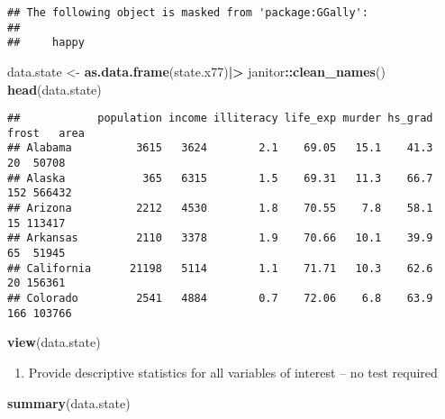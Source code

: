 \documentclass[
]{article}
\newenvironment{Shaded}{\begin{snugshade}}{\end{snugshade}}
\newcommand{\FunctionTok}[1]{\textcolor[rgb]{0.13,0.29,0.53}{\textbf{#1}}}
\newcommand{\NormalTok}[1]{#1}
\newcommand{\OtherTok}[1]{\textcolor[rgb]{0.56,0.35,0.01}{#1}}
\newcommand{\SpecialCharTok}[1]{\textcolor[rgb]{0.81,0.36,0.00}{\textbf{#1}}}
\providecommand{\tightlist}{%
  \setlength{\itemsep}{0pt}\setlength{\parskip}{0pt}}
\begin{document}
\begin{verbatim}
## The following object is masked from 'package:GGally':
## 
##     happy
\end{verbatim}

\begin{Shaded}
\begin{Highlighting}[]
\NormalTok{data.state }\OtherTok{\textless{}{-}} \FunctionTok{as.data.frame}\NormalTok{(state.x77)}\SpecialCharTok{|\textgreater{}} 
\NormalTok{  janitor}\SpecialCharTok{::}\FunctionTok{clean\_names}\NormalTok{() }
\FunctionTok{head}\NormalTok{(data.state)}
\end{Highlighting}
\end{Shaded}

\begin{verbatim}
##            population income illiteracy life_exp murder hs_grad frost   area
## Alabama          3615   3624        2.1    69.05   15.1    41.3    20  50708
## Alaska            365   6315        1.5    69.31   11.3    66.7   152 566432
## Arizona          2212   4530        1.8    70.55    7.8    58.1    15 113417
## Arkansas         2110   3378        1.9    70.66   10.1    39.9    65  51945
## California      21198   5114        1.1    71.71   10.3    62.6    20 156361
## Colorado         2541   4884        0.7    72.06    6.8    63.9   166 103766
\end{verbatim}

\begin{Shaded}
\begin{Highlighting}[]
\FunctionTok{view}\NormalTok{(data.state)}
\end{Highlighting}
\end{Shaded}

\begin{enumerate}
\def\labelenumi{\alph{enumi})}
\tightlist
\item
  Provide descriptive statistics for all variables of interest -- no
  test required
\end{enumerate}

\begin{Shaded}
\begin{Highlighting}[]
\FunctionTok{summary}\NormalTok{(data.state)}
\end{Highlighting}
\end{Shaded}
\end{document}
